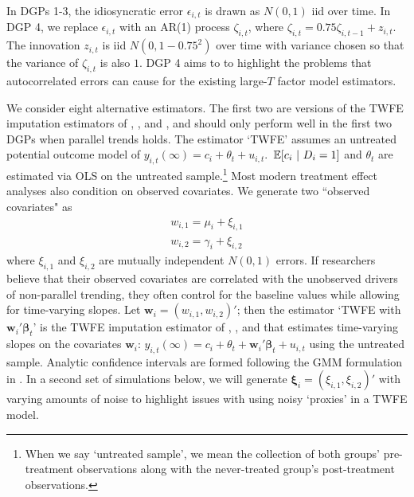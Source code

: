 \documentclass[12pt]{article}
\begin{document}
In DGPs 1-3, the idiosyncratic error $\epsilon_{i,t}$ is drawn as $N(0,1)$ iid over time. 
In DGP 4, we replace $\epsilon_{i,t}$ with an AR(1) process $\zeta_{i,t}$, where $\zeta_{i,t} = 0.75 \zeta_{i,t-1} + z_{i,t}$. The innovation $z_{i,t}$ is iid $N(0, 1 - 0.75^2)$ over time with variance chosen so that the variance of $\zeta_{i,t}$ is also $1$. DGP 4 aims to to highlight the problems that autocorrelated errors can cause for the existing large-$T$ factor model estimators. 


We consider eight alternative estimators. The first two are versions of the TWFE imputation estimators of \citet{Gardner_2021}, \citet{Wooldridge_2021}, and \cite{Borusyak_Jaravel_Spiess_2021}, and should only perform well in the first two DGPs when parallel trends holds. The estimator `TWFE' assumes an untreated potential outcome model of $y_{i,t}(\infty) = c_i + \theta_t + u_{i,t}$. $\expec{c_i}{D_i = 1}$ and $\theta_t$ are estimated via OLS on the untreated sample.\footnote{When we say `untreated sample', we mean the collection of both groups' pre-treatment observations along with the never-treated group's post-treatment observations.} Most modern treatment effect analyses also condition on observed covariates. We generate two ``observed covariates" as 
\begin{gather}
    w_{i,1} = \mu_i + \xi_{i,1}\\
    w_{i,2} = \gamma_i + \xi_{i,2}
\end{gather}
where $\xi_{i,1}$ and $\xi_{i,2}$ are mutually independent $N(0,1)$ errors. 
If researchers believe that their observed covariates are correlated with the unobserved drivers of non-parallel trending, they often control for the baseline values while allowing for time-varying slopes. Let $\bm w_i = (w_{i,1}, w_{i,2})'$; then the estimator `TWFE with $\bm w_i' \bm \beta_t$' is the TWFE imputation estimator of \citet{Gardner_2021}, \citet{Wooldridge_2021}, and \citet{Borusyak_Jaravel_Spiess_2021} that estimates time-varying slopes on the covariates $\bm w_i$: $y_{i,t}(\infty) = c_i + \theta_t + \bm w_i' \bm \beta_t + u_{i,t}$ using the untreated sample. 
Analytic confidence intervals are formed following the GMM formulation in \citet{Gardner_2021}.
In a second set of simulations below, we will generate $\bm \xi_i = (\xi_{i,1}, \xi_{i,2})'$ with varying amounts of noise to highlight issues with using noisy `proxies' in a TWFE model.
\end{document}
